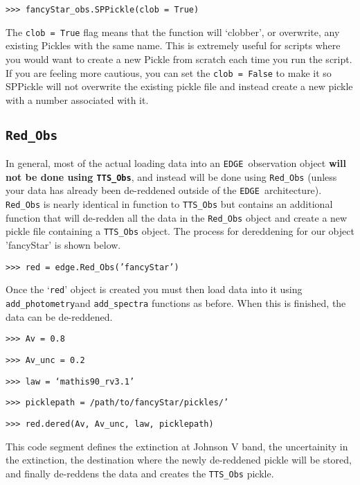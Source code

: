 \documentclass{article}
\newcommand{\edge}{\texttt{EDGE }}
\begin{document}
\vspace{2mm}
\texttt{>>> fancyStar\_obs.SPPickle(clob = True)}
\vspace{2mm}

The \texttt{clob = True} flag means that the function will `clobber', or overwrite, any existing Pickles with the same name. This is extremely useful for scripts where you would want to create a new Pickle from scratch each time you run the script. If you are feeling more cautious, you can set the \texttt{clob = False} to make it so SPPickle will not overwrite the existing pickle file and instead create a new pickle with a number associated with it.

\subsection{\texttt{Red\_Obs}}

In general, most of the actual loading data into an \edge observation object \textbf{will not be done using \texttt{TTS\_Obs}}, and instead will be done using \texttt{Red\_Obs} (unless your data has already been de-reddened outside of the \edge architecture). \texttt{Red\_Obs} is nearly identical in function to \texttt{TTS\_Obs} but contains an additional function that will de-redden all the data in the \texttt{Red\_Obs} object and create a new pickle file containing a \texttt{TTS\_Obs} object.
The process for dereddening for our object 'fancyStar' is shown below.

\vspace{2mm}
\texttt{>>> red =  edge.Red\_Obs('fancyStar')}
\vspace{2mm}

Once the `\texttt{red}' object is created you must then load data into it using \texttt{add\_photometry}and \texttt{add\_spectra} functions as before. When this is finished, the data can be de-reddened.

\vspace{2mm}
\texttt{>>> Av = 0.8}

\texttt{>>> Av\_unc = 0.2}

\texttt{>>> law = `mathis90\_rv3.1'}

\texttt{>>> picklepath = /path/to/fancyStar/pickles/'}

\texttt{>>> red.dered(Av, Av\_unc, law, picklepath)}
\vspace{2mm}

\noindent This code segment defines the extinction at Johnson V band, the uncertainity in the extinction, the destination where the newly de-reddened pickle will be stored, and finally de-reddens the data and creates the \texttt{TTS\_Obs} pickle. 
 
\end{document}
